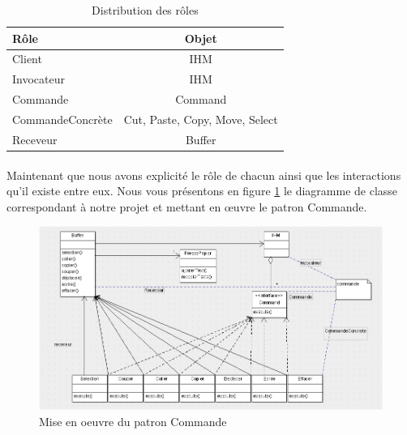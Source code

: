 \documentclass[a4paper,11pt]{article}
\begin{document}
\begin{table}[H]

\caption{Distribution des rôles}

\center

\begin{tabular}{||l|c||}

\hline

\textbf{Rôle} & \textbf{Objet}\\

\hline\hline

Client & IHM \\

\hline

Invocateur & IHM \\

\hline

Commande & Command \\

\hline

CommandeConcrète & Cut, Paste, Copy, Move,  Select \\

\hline

Receveur & Buffer \\

\hline

\end{tabular}

\end{table}



\paragraph{}

Maintenant que nous avons explicité le rôle de chacun ainsi que les interactions qu'il existe entre eux. Nous vous présentons en figure \ref{command} le diagramme de classe correspondant à notre projet et mettant en œuvre le patron Commande.



 \begin{figure}[!ht]

     \center

     \includegraphics [width=15cm]{Command.png}

     \caption{Mise en oeuvre du patron Commande}

    \label{command}

 \end{figure}
\end{document}
